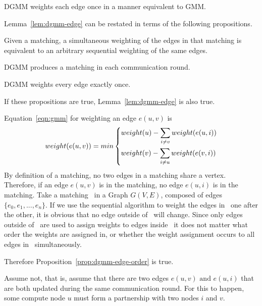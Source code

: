 \begin{lem}
\label{lem:dgmm-edge}
  DGMM weights each edge once in a manner equivalent to GMM.
\end{lem}
\begin{IEEEproof}
  Lemma~\ref{lem:dgmm-edge} can be restated in terms of the following propositions.
  \begin{lprp}
    \label{prop:dgmm-edge-order}
    Given a matching, a simultaneous weighting of the edges in that matching is equivalent to an arbitrary sequential weighting of the same edges.
  \end{lprp}
  \begin{lprp}
    \label{prop:dgmm-edge-match}
    DGMM produces a matching in each communication round.
  \end{lprp}
  \begin{lprp}
    \label{prop:dgmm-edge-once}
    DGMM weights every edge exactly once.
  \end{lprp}
  If these propositions are true, Lemma~\ref{lem:dgmm-edge} is also true. 
  
  \begin{IEEEproof}
    Equation~\ref{eqn:gmm} for weighting an edge $e(u,v)$ is 
    \begin{equation*}
      weight(e(u,v)) = min
      \begin{dcases}
        weight(u) - \sum_{i \ne v} weight(e(u,i))\\
        weight(v) - \sum_{i \ne u} weight(e(v,i))
      \end{dcases}
    \end{equation*}
    By definition of a matching, no two edges in a matching share a vertex. Therefore, if an edge $e(u,v)$ is in the matching, no edge $e(u,i)$ is in the matching. 
    Take a matching \bMd\ in a Graph $G(V,E)$, composed of edges $\{e_0, e_1, ..., e_n\}$. If we use the sequential algorithm to weight the edges in \bMd\ one after the other, it is obvious that no edge outside of \bMd\ will change. Since only edges outside of \bMd\ are used to assign weights to edges inside \bMd\, it does not matter what order the weights are assigned in, or whether the weight assignment occurs to all edges in \bMd\ simultaneously.
    
    Therefore Proposition~\ref{prop:dgmm-edge-order} is true.
  \end{IEEEproof}
  \begin{IEEEproof}
    Assume not, that is, assume that there are two edges $e(u,v) \text{ and } e(u,i)$ that are both updated during the same communication round. For this to happen, some compute node $u$ must form a partnership with two nodes $i$ and $v$. 
    

\end{IEEEproof}
\end{IEEEproof}
